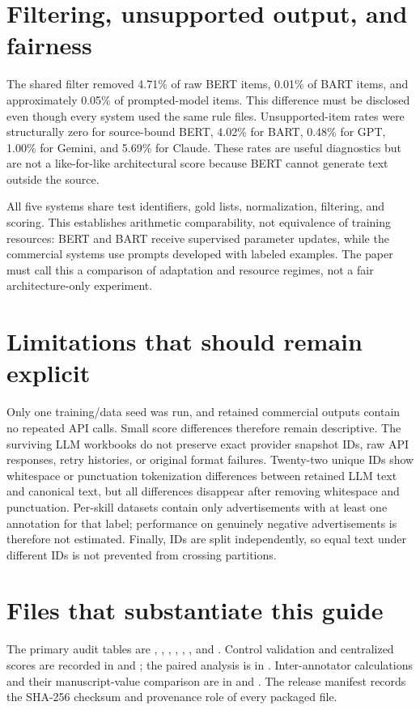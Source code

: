 \documentclass[11pt,a4paper]{article}
\begin{document}
\section{Filtering, unsupported output, and fairness}
The shared filter removed 4.71\% of raw BERT items, 0.01\% of BART items, and
approximately 0.05\% of prompted-model items. This difference must be
disclosed even though every system used the same rule files. Unsupported-item
rates were structurally zero for source-bound BERT, 4.02\% for BART, 0.48\%
for GPT, 1.00\% for Gemini, and 5.69\% for Claude. These rates are useful
diagnostics but are not a like-for-like architectural score because BERT cannot
generate text outside the source.

All five systems share test identifiers, gold lists, normalization, filtering,
and scoring. This establishes arithmetic comparability, not equivalence of
training resources: BERT and BART receive supervised parameter updates, while
the commercial systems use prompts developed with labeled examples. The paper
must call this a comparison of adaptation and resource regimes, not a fair
architecture-only experiment.

\section{Limitations that should remain explicit}
Only one training/data seed was run, and retained commercial outputs contain no
repeated API calls. Small score differences therefore remain descriptive. The
surviving LLM workbooks do not preserve exact provider snapshot IDs, raw API
responses, retry histories, or original format failures. Twenty-two unique IDs
show whitespace or punctuation tokenization differences between retained LLM
text and canonical text, but all differences disappear after removing
whitespace and punctuation. Per-skill datasets contain only advertisements with
at least one annotation for that label; performance on genuinely negative
advertisements is therefore not estimated. Finally, IDs are split independently,
so equal text under different IDs is not prevented from crossing partitions.

\section{Files that substantiate this guide}
The primary audit tables are ,
,
,
, ,
, and
. Control validation and centralized
scores are recorded in  and
; the paired analysis is in
. Inter-annotator calculations and
their manuscript-value comparison are in  and
. The release manifest records the
SHA-256 checksum and provenance role of every packaged file.
\end{document}
